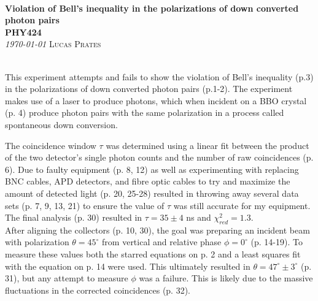\documentclass[11pt]{article}
\newcommand{\CourseDef}{PHY424} %
\newcommand{\TitleDef}{Violation of Bell's inequality in the polarizations of down converted photon pairs} %
\newcommand{\AuthorDef}{Lucas Prates} %
\begin{document}
\thispagestyle{plain}
{\noindent\Huge\bf  \\[0.5\baselineskip] {\selectfont  \TitleDef}         }\\[2\baselineskip] %
{ {\bf {}\selectfont \CourseDef}\\ {\textit{\selectfont     \today}}}\hspace{150pt}    {\large \textsc{\AuthorDef}} %
\\[1.4\baselineskip]
\vspace{-15pt}


\\
This experiment attempts and fails to show the violation of Bell's inequality (p.3) in 
the polarizations of down converted photon pairs (p.1-2). The experiment makes use of a 
laser to produce photons, which when incident on a BBO crystal (p. 4) produce photon 
pairs with the same polarization in a process called spontaneous down conversion.

The coincidence window $\tau$ was determined using a linear fit between the product 
of the two detector's single photon counts and the number of raw coincidences (p. 6). 
Due to faulty equipment (p. 8, 12) as well as experimenting with replacing BNC cables, 
APD detectors, and fibre optic cables to try and maximize the amount of detected light (p. 20, 25-28)
resulted in throwing away several data sets (p. 7, 9, 13, 21) to ensure the value of $\tau$ 
was still accurate for my equipment. The final analysis (p. 30) resulted in $\tau =35 \pm 4$ ns
and $\chi^2_{red}=1.3$.\\

After aligning the collectors (p. 10, 30), the goal was preparing an incident beam with polarization $\theta=45^\circ$ from vertical 
and relative phase $\phi=0^{\circ}$ (p. 14-19).
To measure these values both the starred equations on p. 2 and a least squares fit with the 
equation on p. 14 were used. This ultimately resulted in $\theta=47^{\circ}\pm 3^{\circ}$ (p. 31), but any attempt to measure 
$\phi$ was a failure. This is likely due to the massive fluctuations in the corrected coincidences (p. 32).\\
\end{document}
